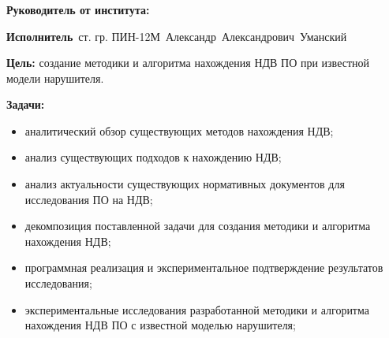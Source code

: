 \begin{frame}
    \frametitle{\textbf{\thesisTitle}}
\textbf{Руководитель от института:}~\supervisorRegaliaShort~\supervisorFioShort

\textbf{Исполнитель}~ст. гр. ПИН-12М~Александр~Александрович~Уманский

\textbf{Цель:} создание методики и алгоритма нахождения НДВ ПО при известной модели нарушителя.

\textbf{Задачи:}
\begin{itemize}
    \item аналитический обзор существующих методов нахождения НДВ;
    \item анализ существующих подходов к нахождению НДВ;
    \item анализ актуальности существующих нормативных документов для исследования ПО на НДВ;
    \item декомпозиция поставленной задачи для создания методики и алгоритма нахождения НДВ;
    \item программная реализация и экспериментальное подтверждение результатов исследования;
    \item экспериментальные исследования разработанной методики и алгоритма нахождения НДВ ПО с известной моделью нарушителя;
\end{itemize}
\end{frame}
